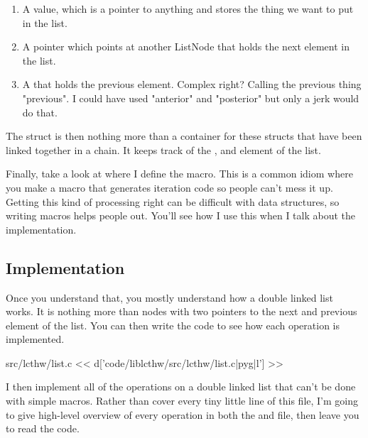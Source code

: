 \begin{enumerate}
\item A value, which is a pointer to anything and stores the thing we want
    to put in the list.
\item A  pointer which points at another ListNode 
    that holds the next element in the list.
\item A  that holds the previous element.  Complex
    right?  Calling the previous thing "previous".  I could have used
    "anterior" and "posterior" but only a jerk would do that.
\end{enumerate}

The  struct is then nothing more than a container for these
 structs that have been linked together in a chain.
It keeps track of the ,  and 
element of the list.

Finally, take a look at  where I define
the  macro.  This is a common idiom where you
make a macro that generates iteration code so people can't mess
it up.  Getting this kind of processing right can be difficult with
data structures, so writing macros helps people out.  You'll see
how I use this when I talk about the implementation.

\subsection{Implementation}

Once you understand that, you mostly understand how a double linked list
works.  It is nothing more than nodes with two pointers to the next and
previous element of the list.  You can then write the 
code to see how each operation is implemented.

\begin{code}{src/lcthw/list.c}
<< d['code/liblcthw/src/lcthw/list.c|pyg|l'] >>
\end{code}

I then implement all of the operations on a double linked list that can't
be done with simple macros.  Rather than cover every tiny little line of
this file, I'm going to give high-level overview of every operation
in both the  and  file, then leave you to read
the code.

